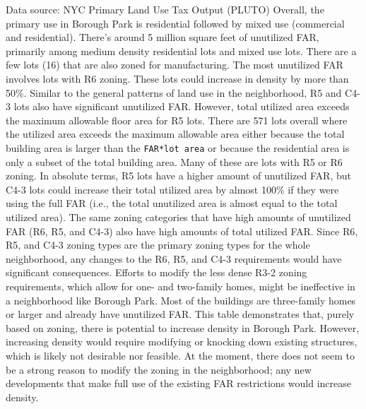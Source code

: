 \documentclass[
  11pt,
  landscape]{article}
\begin{document}
Data source: NYC Primary Land Use Tax Output (PLUTO) \newline \newline
Overall, the primary use in Borough Park is residential followed by
mixed use (commercial and residential). There's around 5 million square
feet of unutilized FAR, primarily among medium density residential lots
and mixed use lots. There are a few lots (16) that are also zoned for
manufacturing. The most unutilized FAR involves lots with R6 zoning.
These lots could increase in density by more than 50\%. Similar to the
general patterns of land use in the neighborhood, R5 and C4-3 lots also
have significant unutilized FAR. However, total utilized area exceeds
the maximum allowable floor area for R5 lots. There are 571 lots overall
where the utilized area exceeds the maximum allowable area either
because the total building area is larger than the
\texttt{FAR*lot\ area} or because the residential area is only a subset
of the total building area. Many of these are lots with R5 or R6 zoning.
\newline \newline In absolute terms, R5 lots have a higher amount of
unutilized FAR, but C4-3 lots could increase their total utilized area
by almost 100\% if they were using the full FAR (i.e., the total
unutilized area is almost equal to the total utilized area). The same
zoning categories that have high amounts of unutilized FAR (R6, R5, and
C4-3) also have high amounts of total utilized FAR. Since R6, R5, and
C4-3 zoning types are the primary zoning types for the whole
neighborhood, any changes to the R6, R5, and C4-3 requirements would
have significant consequences. Efforts to modify the less dense R3-2
zoning requirements, which allow for one- and two-family homes, might be
ineffective in a neighborhood like Borough Park. Most of the buildings
are three-family homes or larger and already have unutilized FAR.
\newline \newline This table demonstrates that, purely based on zoning,
there is potential to increase density in Borough Park. However,
increasing density would require modifying or knocking down existing
structures, which is likely not desirable nor feasible. At the moment,
there does not seem to be a strong reason to modify the zoning in the
neighborhood; any new developments that make full use of the existing
FAR restrictions would increase density.
\end{document}

